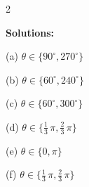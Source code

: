 \documentclass[11pt]{exam}
\begin{document}
\begin{questions}
\begin{multicols}{2}
\begin{parts}
    \part $\displaystyle \tan\theta = \sqrt{3}$, so $\theta=$ \hrulefill\\ 
    \vspace{12pt}
    \part $\displaystyle \sec\theta = 2$, so $\theta=$ \hrulefill\\ 
    \vspace{12pt}    
\columnbreak
    \uplevel{\textbf{Radians: $[0,2\pi)$}} 
    \vspace{12pt}
    \part $\displaystyle \csc\theta = \frac{2\sqrt{3}}{3}$, so $\theta=$ \hrulefill\\ 
    \vspace{12pt}
    \part $\displaystyle \cot\theta \text{ is undefined}$, so $\theta=$ \hrulefill\\ 
    \vspace{12pt}
    \part $\displaystyle \sin\theta = \frac{\sqrt{3}}{2}$, so $\theta=$ \hrulefill\\ 
    \vspace{12pt}
\end{parts}
\end{multicols}
\begin{solution}
\textbf{Solutions:}

(a) \(\theta \in \{ 90^\circ, 270^\circ \}\)

(b) \(\theta \in \{ 60^\circ, 240^\circ \}\)

(c) \(\theta \in \{ 60^\circ, 300^\circ \}\)

(d) \(\theta \in \{ \frac{1}{3} \, \pi, \frac{2}{3} \, \pi \}\)

(e) \(\theta \in \{ 0, \pi \}\)

(f) \(\theta \in \{ \frac{1}{3} \, \pi, \frac{2}{3} \, \pi \}\)
\end{solution}


\end{questions}
\end{document}
